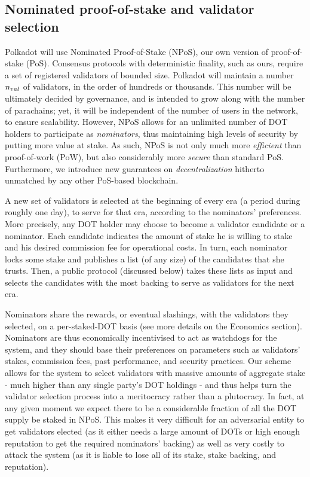 \subsection{Nominated proof-of-stake and validator selection}\label{sec:validators}
Polkadot will use Nominated Proof-of-Stake (NPoS), our own version of proof-of-stake (PoS).
Consensus protocols with deterministic finality, such as ours, require a set of registered validators of bounded size.
Polkadot will maintain a number $n_{val}$ of validators, in the order of hundreds or thousands.
This number will be ultimately decided by governance, and is intended to grow along with the number of parachains;
yet, it will be independent of the number of users in the network, to ensure scalability.
However, NPoS allows for an unlimited number of DOT holders to participate as \emph{nominators},
thus maintaining high levels of security by putting more value at stake.
As such, NPoS is not only much more \emph{efficient} than proof-of-work (PoW),
but also considerably more \emph{secure} than standard PoS.
Furthermore, we introduce new guarantees on \emph{decentralization} hitherto unmatched by any other PoS-based blockchain.

A new set of validators is selected at the beginning of every era (a period during roughly one day),
to serve for that era, according to the nominators' preferences.
More precisely, any DOT holder may choose to become a validator candidate or a nominator.
Each candidate indicates the amount of stake he is willing to stake and his desired commission fee for operational costs.
In turn, each nominator locks some stake and publishes a list (of any size) of the candidates that she trusts.
Then, a public protocol (discussed below) takes these lists as input and selects the candidates
with the most backing to serve as validators for the next era.

Nominators share the rewards, or eventual slashings, with the validators they selected, on a per-staked-DOT basis
(see more details on the Economics section).
Nominators are thus economically incentivised to act as watchdogs for the system, and they should base their preferences 
on parameters such as validators' stakes, commission fees, past performance, and security practices.
Our scheme allows for the system to select validators with massive amounts of aggregate stake
- much higher than any single party's DOT holdings -
and thus helps turn the validator selection process into a meritocracy rather than a plutocracy.
In fact, at any given moment we expect there to be a considerable fraction of all the DOT supply be staked in NPoS.
This makes it very difficult for an adversarial entity to get validators elected
(as it either needs a large amount of DOTs or high enough reputation to get the required nominators' backing)
as well as very costly to attack the system (as it is liable to lose all of its stake, stake backing, and reputation).

